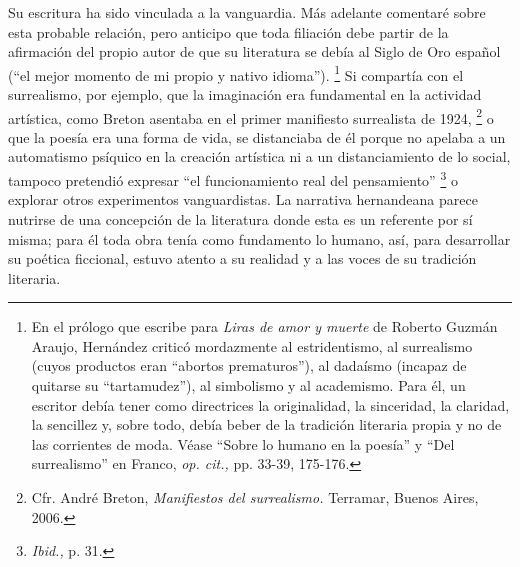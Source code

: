 \documentclass[14pt,twoside,final]{extbook} %
\let\oldfootnote\footnote
\renewcommand\footnote[1]{%
\oldfootnote{\hspace{1mm}#1}}
\begin{document}
Su escritura ha sido vinculada a la vanguardia. Más adelante comentaré sobre esta probable relación, pero anticipo que toda filiación debe partir de la afirmación del propio autor de que su literatura se debía al Siglo de Oro español (``el mejor momento de mi propio y nativo idioma'').\footnote{En el prólogo que escribe para \emph{Liras de amor y muerte} de Roberto Guzmán Araujo, Hernández criticó mordazmente al estridentismo, al surrealismo (cuyos productos eran ``abortos prematuros''), al dadaísmo (incapaz de quitarse su ``tartamudez''), al simbolismo y al academismo. Para él, un escritor debía tener como directrices la originalidad, la sinceridad, la claridad, la sencillez y, sobre todo, debía beber de la tradición literaria propia y no de las corrientes de moda. Véase ``Sobre lo humano en la poesía'' y ``Del surrealismo'' en Franco, \emph{op. cit.,} pp. 33-39, 175-176.} Si compartía con el surrealismo, por ejemplo, que la imaginación era fundamental en la actividad artística, como Breton asentaba en el primer manifiesto surrealista de 1924,\footnote{Cfr. André Breton, \emph{Manifiestos del surrealismo.} Terramar, Buenos Aires, 2006.} o que la poesía era una forma de vida, se distanciaba de él porque no apelaba a un automatismo psíquico en la creación artística ni a un distanciamiento de lo social, tampoco pretendió expresar ``el funcionamiento real del pensamiento''\footnote{\emph{Ibid.,} p. 31.} o explorar otros experimentos vanguardistas. La narrativa hernandeana parece nutrirse de una concepción de la literatura donde esta es un referente por sí misma; para él toda obra tenía como fundamento lo humano, así, para desarrollar su poética ficcional, estuvo atento a su realidad y a las voces de su tradición literaria.
\end{document}
